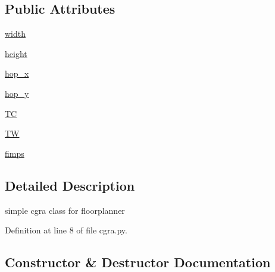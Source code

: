 \subsection*{Public Attributes}
\begin{DoxyCompactItemize}
\item 
\hyperlink{classsylva_1_1base_1_1cgra_1_1cgra_a9efe9218f0c8eb76d2afa0337af1c0f2}{width}
\item 
\hyperlink{classsylva_1_1base_1_1cgra_1_1cgra_a1b1902a730c5ff918da267f662c39ece}{height}
\item 
\hyperlink{classsylva_1_1base_1_1cgra_1_1cgra_aadc7f8128f82f0ee772bf35b2169597e}{hop\+\_\+x}
\item 
\hyperlink{classsylva_1_1base_1_1cgra_1_1cgra_aaaed8b52a3aa573699d89fcee405b098}{hop\+\_\+y}
\item 
\hyperlink{classsylva_1_1base_1_1cgra_1_1cgra_a06d7bc08e37fe58d200134da5ecb7336}{TC}
\item 
\hyperlink{classsylva_1_1base_1_1cgra_1_1cgra_a5e0af81085855ab41e2131de593af9da}{TW}
\item 
\hyperlink{classsylva_1_1base_1_1cgra_1_1cgra_ad4e2965612f63dfd12593a5fe3ace3ac}{fimps}
\end{DoxyCompactItemize}


\subsection{Detailed Description}
\begin{DoxyVerb}simple cgra class for floorplanner\end{DoxyVerb}
 

Definition at line 8 of file cgra.\+py.



\subsection{Constructor \& Destructor Documentation}
\mbox{\label{classsylva_1_1base_1_1cgra_1_1cgra_a8eb2125d36590b1d58bb4890bda88f6e}} 
